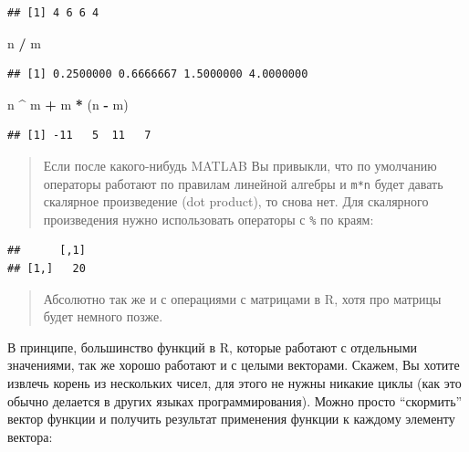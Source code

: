 \documentclass[]{book}
\newenvironment{Shaded}{\begin{snugshade}}{\end{snugshade}}
\newcommand{\NormalTok}[1]{#1}
\newcommand{\OperatorTok}[1]{\textcolor[rgb]{0.81,0.36,0.00}{\textbf{#1}}}
\newcommand{\StringTok}[1]{\textcolor[rgb]{0.31,0.60,0.02}{#1}}
\begin{document}
\begin{verbatim}
## [1] 4 6 6 4
\end{verbatim}

\begin{Shaded}
\begin{Highlighting}[]
\NormalTok{n }\OperatorTok{/}\StringTok{ }\NormalTok{m}
\end{Highlighting}
\end{Shaded}

\begin{verbatim}
## [1] 0.2500000 0.6666667 1.5000000 4.0000000
\end{verbatim}

\begin{Shaded}
\begin{Highlighting}[]
\NormalTok{n }\OperatorTok{^}\StringTok{ }\NormalTok{m }\OperatorTok{+}\StringTok{ }\NormalTok{m }\OperatorTok{*}\StringTok{ }\NormalTok{(n }\OperatorTok{-}\StringTok{ }\NormalTok{m)}
\end{Highlighting}
\end{Shaded}

\begin{verbatim}
## [1] -11   5  11   7
\end{verbatim}

\begin{quote}
Если после какого-нибудь MATLAB Вы привыкли, что по умолчанию операторы работают по правилам линейной алгебры и \texttt{m*n} будет давать скалярное произведение (dot product), то снова нет. Для скалярного произведения нужно использовать операторы с \texttt{\%} по краям:
\end{quote}

\begin{Shaded}
\end{Shaded}

\begin{verbatim}
##      [,1]
## [1,]   20
\end{verbatim}

\begin{quote}
Абсолютно так же и с операциями с матрицами в R, хотя про матрицы будет немного позже.
\end{quote}

В принципе, большинство функций в R, которые работают с отдельными значениями, так же хорошо работают и с целыми векторами. Скажем, Вы хотите извлечь корень из нескольких чисел, для этого не нужны никакие циклы (как это обычно делается в других языках программирования). Можно просто ``скормить'' вектор функции и получить результат применения функции к каждому элементу вектора:
\end{document}
